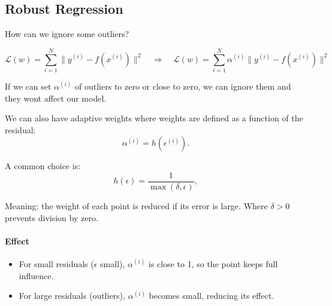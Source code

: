 \documentclass[11pt]{article}
\begin{document}
\subsection*{Robust Regression}
How can we ignore some outliers?

\[
	\mathcal{L}(w) = \sum_{i=1}^N \bigl\lVert y^{(i)} - f(x^{(i)}) \bigr\rVert^2
	\quad \Longrightarrow \quad
	\mathcal{L}(w) = \sum_{i=1}^N \alpha^{(i)} \bigl\lVert y^{(i)} - f(x^{(i)}) \bigr\rVert^2
\]

If we can set $\alpha^{(i)}$ of outliers to zero or close to zero, we can ignore them and they wont affect our model.

We can also have adaptive weights where weights are defined as a function of the residual:
\[
	\alpha^{(i)} = h(\epsilon^{(i)}).
\]

A common choice is:
\[
	h(\epsilon) = \frac{1}{\max(\delta, \epsilon)},
\]

Meaning: the weight of each point is reduced if its error is large. Where $\delta > 0$ prevents division by zero.

\paragraph{Effect}
\begin{itemize}
	\item For small residuals ($\epsilon$ small), $\alpha^{(i)}$ is close to 1, so the point keeps full influence.
	\item For large residuals (outliers), $\alpha^{(i)}$ becomes small, reducing its effect.
\end{itemize}
\end{document}
